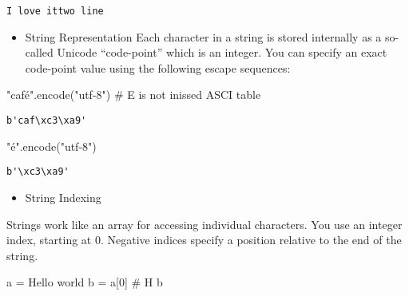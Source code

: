 \documentclass[
  letterpaper,
  DIV=11,
  numbers=noendperiod]{scrreprt}
\newenvironment{Shaded}{\begin{snugshade}}{\end{snugshade}}
\newcommand{\CommentTok}[1]{\textcolor[rgb]{0.37,0.37,0.37}{#1}}
\newcommand{\DecValTok}[1]{\textcolor[rgb]{0.68,0.00,0.00}{#1}}
\newcommand{\NormalTok}[1]{\textcolor[rgb]{0.00,0.46,0.62}{#1}}
\newcommand{\OperatorTok}[1]{\textcolor[rgb]{0.37,0.37,0.37}{#1}}
\newcommand{\StringTok}[1]{\textcolor[rgb]{0.13,0.47,0.30}{#1}}
\providecommand{\tightlist}{%
  \setlength{\itemsep}{0pt}\setlength{\parskip}{0pt}}
\begin{document}
\begin{verbatim}
I love ittwo line 
\end{verbatim}

\begin{itemize}
\tightlist
\item
  String Representation Each character in a string is stored internally
  as a so-called Unicode ``code-point'' which is an integer. You can
  specify an exact code-point value using the following escape
  sequences:
\end{itemize}

\begin{Shaded}
\begin{Highlighting}[]
\CommentTok{"café"}\NormalTok{.encode(}\StringTok{"utf{-}8"}\NormalTok{) }\CommentTok{\# E is not inissed ASCI table}
\end{Highlighting}
\end{Shaded}

\begin{verbatim}
b'caf\xc3\xa9'
\end{verbatim}

\begin{Shaded}
\begin{Highlighting}[]
\CommentTok{"é"}\NormalTok{.encode(}\StringTok{"utf{-}8"}\NormalTok{)}
\end{Highlighting}
\end{Shaded}

\begin{verbatim}
b'\xc3\xa9'
\end{verbatim}

\begin{itemize}
\tightlist
\item
  String Indexing
\end{itemize}

Strings work like an array for accessing individual characters. You use
an integer index, starting at 0. Negative indices specify a position
relative to the end of the string.

\begin{Shaded}
\begin{Highlighting}[]
\NormalTok{a }\OperatorTok{=} \StringTok{\textquotesingle{}Hello world\textquotesingle{}}
\NormalTok{b }\OperatorTok{=}\NormalTok{ a[}\DecValTok{0}\NormalTok{]          }\CommentTok{\# \textquotesingle{}H\textquotesingle{}}
\NormalTok{b}
\end{Highlighting}
\end{Shaded}
\end{document}
